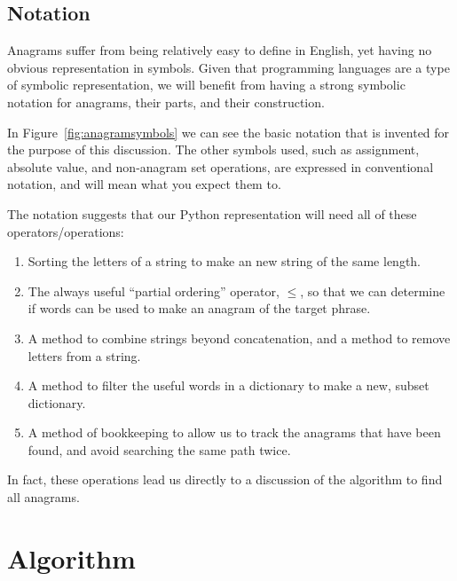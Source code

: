 \documentclass[letterpaper, 11pt]{article}
\newcommand{\D}{$\mathfrak{D}$\xspace}
\begin{document}
\begin{samepage}
\section{Notation}

Anagrams suffer from being relatively easy to define
in English, yet having no obvious representation in symbols. Given
that programming languages are a type of symbolic representation,
we will benefit from having a strong symbolic notation for anagrams,
their parts, and their construction.
\end{samepage}

In Figure~\ref{fig:anagramsymbols} we can see the basic notation
that is invented for the purpose of this discussion. The other
symbols used, such as assignment, absolute value, and non-anagram
set operations, are expressed in conventional notation, and will
mean what you expect them to.

The notation suggests that our Python representation will need all
of these operators/operations:

\begin{enumerate}
\item Sorting the letters of a string to make an new string of the 
same length.

\item The always useful ``partial ordering'' operator, $\leq$, so that
we can determine if words can be used to make an anagram of the target
phrase.

\item A method to combine strings beyond concatenation, and a method
to remove letters from a string.

\item A method to filter the useful words in a dictionary to make
a new, subset dictionary.

\item A method of bookkeeping to allow us to track the anagrams that
have been found, and avoid searching the same path twice.
\end{enumerate}

In fact, these operations lead us directly to a discussion of the 
algorithm to find all anagrams. 

\newpage
\section{Algorithm}

\end{document}
